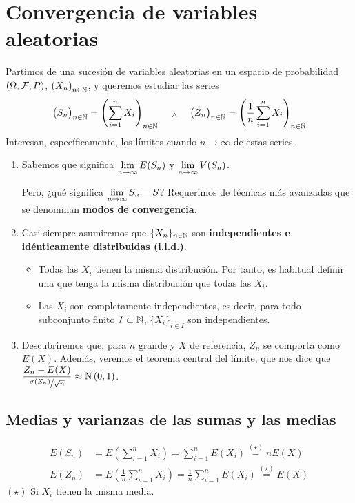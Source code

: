 
\section{Convergencia de variables aleatorias}

Partimos de una sucesión de variables aleatorias en un espacio de probabilidad $(\Omega, \mathcal{F}, P)$, $\displaystyle \left(X_n\right)_{n \in \mathbb{N}}$, y queremos estudiar las series
\[\big(S_n\big)_{n\in \mathbb{N}} = \left(\sum_{i=1}^{n} X_i\right)_{n \in \mathbb{N}} \quad \; _{\wedge} \; \quad \big(Z_n\big)_{n\in \mathbb{N}} = \left(\frac{1}{n}\sum_{i=1}^{n} X_i\right)_{n \in \mathbb{N}}\]
Interesan, específicamente, los límites cuando $n\to \infty$ de estas series.
\begin{enumerate}
	\item Sabemos que significa $\displaystyle \lim_{n\to\infty} E(S_n)$ y $\displaystyle \lim_{n\to\infty} V(S_n)$.

	      Pero, ¿qué significa $\displaystyle \lim_{n\to\infty} S_n = S$? Requerimos de técnicas más avanzadas que se denominan \textbf{modos de convergencia}.
	\item Casi siempre asumiremos que $\{X_n\}_{n\in \mathbb{N}}$ son \textbf{independientes e idénticamente distribuidas (i.i.d.)}.
	      \begin{itemize}
		      \item Todas las $X_i$ tienen la misma distribución. Por tanto, es habitual definir una  que tenga la misma distribución que todas las $X_i$.
		      \item Las $X_i$ son completamente independientes, es decir, para todo subconjunto finito $I \subset \mathbb{N}$, $\{X_i\}_{i\in I}$ son independientes.
	      \end{itemize}
	\item Descubriremos que, para $n$ grande y $X$ de referencia, $Z_n$ se comporta como $E(X)$. Además, veremos el teorema central del límite, que nos dice que $\displaystyle \frac{Z_n-E(X)}{\sfrac{\sigma(Z_n)}{\sqrt{n}}} \approx \operatorname{N}\left(0,1\right)$.
\end{enumerate}
\subsection{Medias y varianzas de las sumas y las medias}
\[\begin{aligned}
		E(S_n) & = E\left(\sum_{i=1}^{n} X_i\right) = \sum_{i=1}^{n} E(X_i) \stackrel{(\star)}{=} nE(X)                      \\
		E(Z_n) & = E\left(\frac{1}{n}\sum_{i=1}^{n} X_i\right) = \frac{1}{n}\sum_{i=1}^{n} E(X_i) \stackrel{(\star)}{=} E(X)
	\end{aligned}\]
\hspace*{\fill} $(\star)$ Si $X_i$ tienen la misma media.

